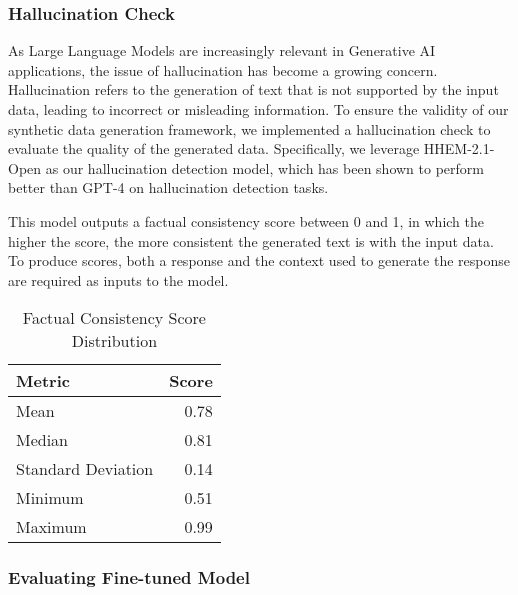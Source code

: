 \subsubsection{Hallucination Check}

As Large Language Models are increasingly relevant in Generative AI applications, the issue of hallucination has become a growing concern.
Hallucination refers to the generation of text that is not supported by the input data, leading to incorrect or misleading information.
To ensure the validity of our synthetic data generation framework, we implemented a hallucination check to evaluate the quality of the generated data.
Specifically, we leverage HHEM-2.1-Open %
as our hallucination detection model, which has been shown to perform better than GPT-4 on hallucination detection tasks.

This model outputs a factual consistency score between 0 and 1, in which the higher the score, the more consistent the generated text is with the input data.
To produce scores, both a response and the context used to generate the response are required as inputs to the model.

\begin{table}[h]
\centering
\caption{Factual Consistency Score Distribution}
\begin{tabular}{lr}
\hline
Metric & Score \\
\hline
Mean & 0.78 \\
Median & 0.81 \\
Standard Deviation & 0.14 \\
Minimum & 0.51 \\
Maximum & 0.99 \\
\hline
\end{tabular}
\label{tab:factual-consistency-scores}
\end{table}

\subsubsection{Evaluating Fine-tuned Model}


